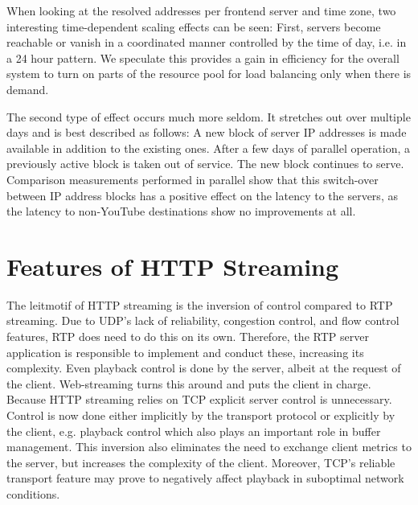When looking at the resolved addresses per frontend server and time zone, two interesting time-dependent scaling effects can be seen: First, servers become reachable or vanish in a coordinated manner controlled by the time of day, i.e. in a 24 hour pattern. We speculate this provides a gain in efficiency for the overall system to turn on parts of the resource pool for load balancing only when there is demand.

The second type of effect occurs much more seldom. It stretches out over multiple days and is best described as follows: A new block of server IP addresses is made available in addition to the existing ones. After a few days of parallel operation, a previously active block is taken out of service. The new block continues to serve. Comparison measurements  performed in parallel show that this switch-over between IP address blocks has a positive effect on the latency to the servers, as the latency to non-YouTube destinations show no improvements at all.





\section{Features of HTTP Streaming}
\label{sec:featureshttpstreaming}

The leitmotif of HTTP streaming is the inversion of control compared to RTP streaming. Due to UDP's lack of reliability, congestion control, and flow control features, RTP does need to do this on its own. Therefore, the RTP server application is responsible to implement and conduct these, increasing its complexity. Even playback control is done by the server, albeit at the request of the client. Web-streaming turns this around and puts the client in charge. Because HTTP streaming relies on TCP explicit server control is unnecessary. Control is now done either implicitly by the transport protocol or explicitly by the client, e.g. playback control which also plays an important role in buffer management. This inversion also eliminates the need to exchange client metrics to the server, but increases the complexity of the client. Moreover, TCP's reliable transport feature may prove to negatively affect playback in suboptimal network conditions.



